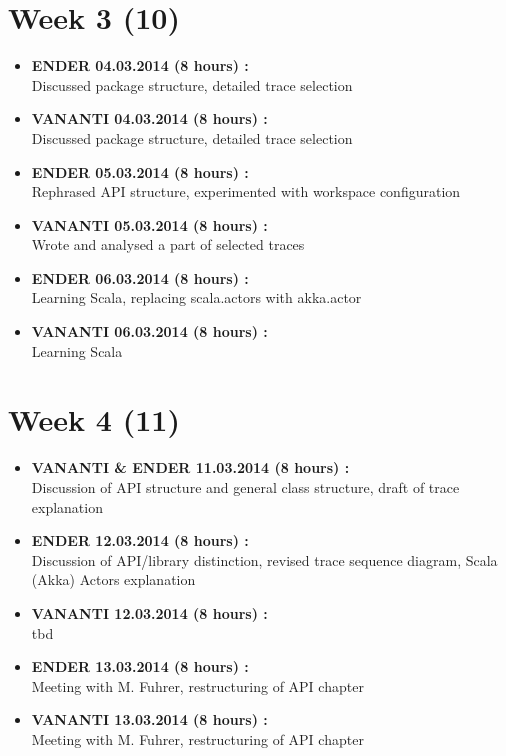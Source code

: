 \documentclass[
	a4paper,					10pt,							twoside,					openright,				notitlepage,			parskip=half,			]{scrreprt}
\begin{document}
\section*{Week 3 (10)}
\label{sec:worklog_03}
\begin{itemize}
\item{\textbf{ENDER 04.03.2014 (8 hours) :} \\  Discussed package structure, detailed trace selection}
\item{\textbf{VANANTI 04.03.2014 (8 hours) :} \\  Discussed package structure, detailed trace selection}
\item{\textbf{ENDER 05.03.2014 (8 hours) :} \\  Rephrased API structure, experimented with workspace configuration}
\item{\textbf{VANANTI 05.03.2014 (8 hours) :} \\  Wrote and analysed a part of selected traces}
\item{\textbf{ENDER 06.03.2014 (8 hours) :} \\  Learning Scala, replacing scala.actors with akka.actor}
\item{\textbf{VANANTI 06.03.2014 (8 hours) :} \\  Learning Scala}
\end{itemize}
\section*{Week 4 (11)}
\label{sec:worklog_04}
\begin{itemize}
\item{\textbf{VANANTI \& ENDER 11.03.2014 (8 hours) :} \\  Discussion of API structure and general class structure, draft of trace explanation}
\item{\textbf{ENDER 12.03.2014 (8 hours) : }\\ Discussion of API/library distinction, revised trace sequence diagram, Scala (Akka) Actors explanation}
\item{\textbf{VANANTI 12.03.2014 (8 hours) :} \\  tbd}
\item{\textbf{ENDER 13.03.2014 (8 hours) :} \\  Meeting with M. Fuhrer, restructuring of API chapter}
\item{\textbf{VANANTI 13.03.2014 (8 hours) :} \\  Meeting with M. Fuhrer, restructuring of API chapter}
\end{itemize}
\end{document}
